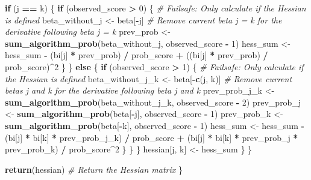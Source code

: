 \documentclass[
]{article}
\newenvironment{Shaded}{\begin{snugshade}}{\end{snugshade}}
\newcommand{\CommentTok}[1]{\textcolor[rgb]{0.56,0.35,0.01}{\textit{#1}}}
\newcommand{\ControlFlowTok}[1]{\textcolor[rgb]{0.13,0.29,0.53}{\textbf{#1}}}
\newcommand{\DecValTok}[1]{\textcolor[rgb]{0.00,0.00,0.81}{#1}}
\newcommand{\FunctionTok}[1]{\textcolor[rgb]{0.13,0.29,0.53}{\textbf{#1}}}
\newcommand{\NormalTok}[1]{#1}
\newcommand{\OtherTok}[1]{\textcolor[rgb]{0.56,0.35,0.01}{#1}}
\newcommand{\SpecialCharTok}[1]{\textcolor[rgb]{0.81,0.36,0.00}{\textbf{#1}}}
\begin{document}
\begin{Shaded}
\begin{Highlighting}[]
          \ControlFlowTok{if}\NormalTok{ (j }\SpecialCharTok{==}\NormalTok{ k) \{}
            \ControlFlowTok{if}\NormalTok{ (observed\_score }\SpecialCharTok{\textgreater{}} \DecValTok{0}\NormalTok{) \{  }\CommentTok{\# Failsafe: Only calculate if the Hessian is defined}
\NormalTok{              beta\_without\_j }\OtherTok{\textless{}{-}}\NormalTok{ beta[}\SpecialCharTok{{-}}\NormalTok{j] }\CommentTok{\# Remove current beta j = k for the derivative following beta j = k}
\NormalTok{              prev\_prob }\OtherTok{\textless{}{-}} \FunctionTok{sum\_algorithm\_prob}\NormalTok{(beta\_without\_j, observed\_score }\SpecialCharTok{{-}} \DecValTok{1}\NormalTok{)}
\NormalTok{              hess\_sum }\OtherTok{\textless{}{-}}\NormalTok{ hess\_sum }\SpecialCharTok{{-}}\NormalTok{ (bi[j] }\SpecialCharTok{*}\NormalTok{ prev\_prob) }\SpecialCharTok{/}\NormalTok{ prob\_score }\SpecialCharTok{+}\NormalTok{ ((bi[j] }\SpecialCharTok{*}\NormalTok{ prev\_prob) }\SpecialCharTok{/}\NormalTok{ prob\_score)}\SpecialCharTok{\^{}}\DecValTok{2}
\NormalTok{            \}}
\NormalTok{          \} }\ControlFlowTok{else}\NormalTok{ \{}
            \ControlFlowTok{if}\NormalTok{ (observed\_score }\SpecialCharTok{\textgreater{}} \DecValTok{1}\NormalTok{) \{  }\CommentTok{\# Failsafe: Only calculate if the Hessian is defined}
\NormalTok{              beta\_without\_j\_k }\OtherTok{\textless{}{-}}\NormalTok{ beta[}\SpecialCharTok{{-}}\FunctionTok{c}\NormalTok{(j, k)] }\CommentTok{\# Remove current betas j and k for the derivative following beta j and k}
\NormalTok{              prev\_prob\_j\_k }\OtherTok{\textless{}{-}} \FunctionTok{sum\_algorithm\_prob}\NormalTok{(beta\_without\_j\_k, observed\_score }\SpecialCharTok{{-}} \DecValTok{2}\NormalTok{)}
\NormalTok{              prev\_prob\_j }\OtherTok{\textless{}{-}} \FunctionTok{sum\_algorithm\_prob}\NormalTok{(beta[}\SpecialCharTok{{-}}\NormalTok{j], observed\_score }\SpecialCharTok{{-}} \DecValTok{1}\NormalTok{)}
\NormalTok{              prev\_prob\_k }\OtherTok{\textless{}{-}} \FunctionTok{sum\_algorithm\_prob}\NormalTok{(beta[}\SpecialCharTok{{-}}\NormalTok{k], observed\_score }\SpecialCharTok{{-}} \DecValTok{1}\NormalTok{)}
\NormalTok{              hess\_sum }\OtherTok{\textless{}{-}}\NormalTok{ hess\_sum }\SpecialCharTok{{-}}\NormalTok{ (bi[j] }\SpecialCharTok{*}\NormalTok{ bi[k] }\SpecialCharTok{*}\NormalTok{ prev\_prob\_j\_k) }\SpecialCharTok{/}\NormalTok{ prob\_score }\SpecialCharTok{+}\NormalTok{ (bi[j] }\SpecialCharTok{*}\NormalTok{ bi[k] }\SpecialCharTok{*}\NormalTok{ prev\_prob\_j }\SpecialCharTok{*}\NormalTok{ prev\_prob\_k) }\SpecialCharTok{/}\NormalTok{ prob\_score}\SpecialCharTok{\^{}}\DecValTok{2}
\NormalTok{          \}}
\NormalTok{        \}}
\NormalTok{      \}}
\NormalTok{      hessian[j, k] }\OtherTok{\textless{}{-}}\NormalTok{ hess\_sum}
\NormalTok{    \}}
\NormalTok{  \}}
  
  \FunctionTok{return}\NormalTok{(hessian)  }\CommentTok{\# Return the Hessian matrix}
\NormalTok{\}}
\end{Highlighting}
\end{Shaded}
\end{document}
